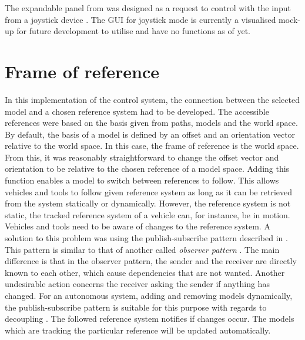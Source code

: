 The expandable panel from  was designed as a request to control with the input from a joystick device \cite{joystick}. The GUI for joystick mode is currently a visualised mock-up for future development to utilise and have no functions as of yet.

\section{Frame of reference}

In this implementation of the control system, the connection between the selected model and a chosen reference system had to be developed. The accessible references were based on the basis given from paths, models and the world space. By default, the basis of a model is defined by an offset and an orientation vector relative to the world space. In this case, the frame of reference is the world space. From this, it was reasonably straightforward to change the offset vector and orientation to be relative to the chosen reference of a model space. Adding this function enables a model to switch between references to follow. This allows vehicles and tools to follow given reference system as long as it can be retrieved from the system statically or dynamically. However, the reference system is not static, the tracked reference system of a vehicle can, for instance, be in motion. Vehicles and tools need to be aware of changes to the reference system. A solution to this problem was using the publish-subscribe pattern described in . This pattern is similar to that of another called \textit{observer pattern} \cite{observer_pattern}. The main difference is that in the observer pattern, the sender and the receiver are directly known to each other, which cause dependencies that are not wanted. Another undesirable action concerns the receiver asking the sender if anything has changed. For an autonomous system, adding and removing models dynamically, the publish-subscribe pattern is suitable for this purpose with regards to decoupling \cite{decoupling}. The followed reference system notifies if changes occur. The models which are tracking the particular reference will be updated automatically.  

